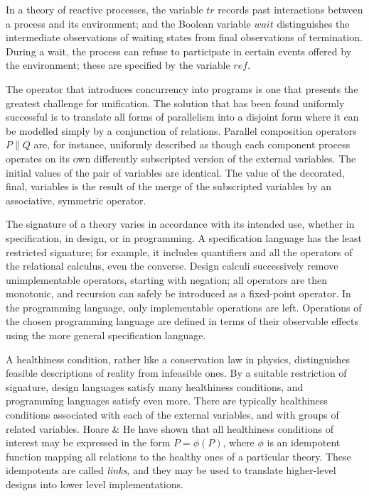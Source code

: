 \documentclass{article}
\begin{document}
In a theory of reactive processes, the variable $tr$ records past
interactions between a process and its environment; and the Boolean
variable $wait$ distinguishes the intermediate observations of waiting
states from final observations of termination.  During a wait, the
process can refuse to participate in certain events offered by the
environment; these are specified by the variable $ref$.

The operator that introduces concurrency into programs is one that
presents the greatest challenge for unification.  The solution that
has been found uniformly successful is to translate all forms of
parallelism into a disjoint form where it can be modelled simply by a
conjunction of relations.  Parallel composition operators $P \parallel
Q$ are, for instance, uniformly described as though each component
process operates on its own differently subscripted version of the
external variables.  The initial values of the pair of variables are
identical.  The value of the decorated, final, variables is the result
of the merge of the subscripted variables by an associative, symmetric
operator.

The signature of a theory varies in accordance with its intended use,
whether in specification, in design, or in programming.  A
specification language has the least restricted signature; for
example, it includes quantifiers and all the operators of the
relational calculus, even the converse.  Design calculi successively
remove unimplementable operators, starting with negation; all
operators are then monotonic, and recursion can safely be introduced
as a fixed-point operator.  In the programming language, only
implementable operations are left.  Operations of the chosen
programming language are defined in terms of their observable effects
using the more general specification language.

A healthiness condition, rather like a conservation law in physics,
distinguishes feasible descriptions of reality from infeasible ones.
By a suitable restriction of signature, design languages satisfy many
healthiness conditions, and programming languages satisfy even more.
There are typically healthiness conditions associated with each of the
external variables, and with groups of related variables.  Hoare \& He
have shown that all healthiness conditions of interest may be
expressed in the form $P = \phi(P)$, where $\phi$ is an idempotent
function mapping all relations to the healthy ones of a particular
theory.  These idempotents are called \emph{links}, and they may be
used to translate higher-level designs into lower level
implementations.
\end{document}
